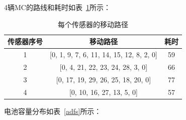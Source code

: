 \documentclass{whutmod}
\begin{document}
            4辆MC的路线和耗时如表~\ref{bidsao2}所示：

            \begin{table}[H]
                \centering
                \caption{每个传感器的移动路径}\label{bidsao2}
                \begin{tabular}{ccc}
                    \toprule[2pt]
                    \multicolumn{1}{m{2.5cm}}{\centering 传感器序号} &
                    \multicolumn{1}{m{4.5cm}}{\centering 移动路径} &
                    \multicolumn{1}{m{2.5cm}}{\centering 耗时} \\
                    \midrule[1pt]
                    1 & [0, 1, 9, 7, 6, 11, 14, 15, 12, 8, 2, 0] & 59 \\
                    2 & [0, 4, 21, 22, 23, 24, 28, 3, 0] & 66 \\
                    3 & [0, 17, 19, 29, 26, 25, 18, 20, 0] & 77 \\
                    4 & [0, 10, 16, 27, 13, 5, 0] & 57 \\
                    \bottomrule[2pt]
                \end{tabular}
            \end{table}

            电池容量分布如表~\ref{adfs}所示：
\end{document}
